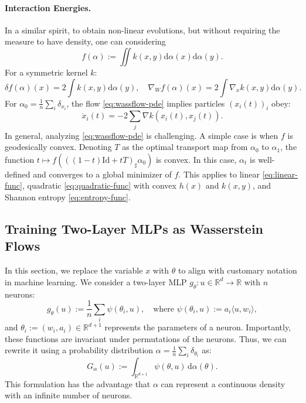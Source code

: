 \paragraph{Interaction Energies.} In a similar spirit, to obtain non-linear evolutions, but without requiring the measure to have density, one can considering
   \begin{equation}
       f(\alpha) := \iint k(x, y) \mathrm{d} \alpha(x) \mathrm{d} \alpha(y). \label{eq:quadratic-func}
   \end{equation}
   For a symmetric kernel $k$:
   \begin{equation}
       \delta f(\alpha)(x) = 2 \int k(x, y) \mathrm{d} \alpha(y), \quad \nabla_W f(\alpha)(x) = 2 \int \nabla_x k(x, y) \mathrm{d} \alpha(y).
   \end{equation}
   For $\alpha_0 = \frac{1}{n} \sum_i \delta_{x_i}$, the flow \eqref{eq:wassflow-pde} implies particles $(x_i(t))_i$ obey:
   \begin{equation}
       \dot{x}_i(t) = -2 \sum_j \nabla k(x_i(t), x_j(t)).
   \end{equation}
In general, analyzing \eqref{eq:wassflow-pde} is challenging. A simple case is when $f$ is geodesically convex. Denoting $T$ as the optimal transport map from $\alpha_0$ to $\alpha_1$, the function $t \mapsto f(((1-t)\mathrm{Id} + tT)_\sharp \alpha_0)$ is convex. In this case, $\alpha_t$ is well-defined and converges to a global minimizer of $f$. This applies to linear \eqref{eq:linear-func}, quadratic \eqref{eq:quadratic-func} with convex $h(x)$ and $k(x, y)$, and Shannon entropy \eqref{eq:entropy-func}.

\subsection{Training Two-Layer MLPs as Wasserstein Flows}

In this section, we replace the variable $x$ with $\theta$ to align with customary notation in machine learning. 
%
We consider a two-layer MLP $g_\theta : u \in \mathbb{R}^d \to \mathbb{R}$ with $n$ neurons:
\begin{equation}
    g_\theta(u) := \frac{1}{n} \sum_i \psi(\theta_i, u), \quad \text{where } \psi(\theta_i, u) := a_i \langle u, w_i \rangle,
\end{equation}
and $\theta_i := (w_i, a_i) \in \mathbb{R}^{d+1}$ represents the parameters of a neuron. Importantly, these functions are invariant under permutations of the neurons. Thus, we can rewrite it using a probability distribution $\alpha = \frac{1}{n} \sum_i \delta_{\theta_i}$ as:
\begin{equation}
    G_\alpha(u) := \int_{\mathbb{R}^{d+1}} \psi(\theta, u) \, \mathrm{d} \alpha(\theta).
\end{equation}
This formulation has the advantage that $\alpha$ can represent a continuous density with an infinite number of neurons.


